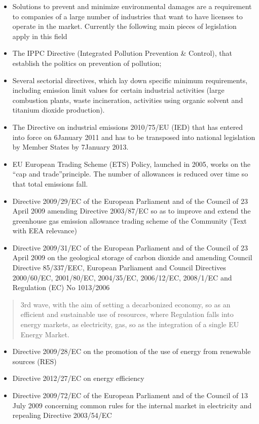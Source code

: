 \documentclass[]{book}
\theoremstyle{definition}
\theoremstyle{definition}
\theoremstyle{definition}
\theoremstyle{remark}
\begin{document}
\begin{itemize}
\item
  Solutions to prevent and minimize environmental damages are a
  requirement to companies of a large number of industries that want to
  have licenses to operate in the market. Currently the following main
  pieces of legislation apply in this field
\item
  The IPPC Directive (Integrated Pollution Prevention \& Control), that
  establish the politics on prevention of pollution;
\item
  Several sectorial directives, which lay down specific minimum
  requirements, including emission limit values for certain industrial
  activities (large combustion plants, waste incineration, activities
  using organic solvent and titanium dioxide production).
\item
  The Directive on industrial emissions 2010/75/EU (IED) that has
  entered into force on 6January 2011 and has to be transposed into
  national legislation by Member States by 7January 2013.
\item
  EU European Trading Scheme (ETS) Policy, launched in 2005, works on
  the ``cap and trade''principle. The number of allowances is reduced
  over time so that total emissions fall.
\item
  Directive 2009/29/EC of the European Parliament and of the Council of
  23 April 2009 amending Directive 2003/87/EC so as to improve and
  extend the greenhouse gas emission allowance trading scheme of the
  Community (Text with EEA relevance)
\item
  Directive 2009/31/EC of the European Parliament and of the Council of
  23 April 2009 on the geological storage of carbon dioxide and amending
  Council Directive 85/337/EEC, European Parliament and Council
  Directives 2000/60/EC, 2001/80/EC, 2004/35/EC, 2006/12/EC, 2008/1/EC
  and Regulation (EC) No 1013/2006
\end{itemize}

\begin{quote}
3rd wave, with the aim of setting a decarbonized economy, so as an
efficient and sustainable use of resources, where Regulation falls into
energy markets, as electricity, gas, so as the integration of a single
EU Energy Market.
\end{quote}

\begin{itemize}
\item
  Directive 2009/28/EC on the promotion of the use of energy from
  renewable sources (RES)
\item
  Directive 2012/27/EC on energy efficiency
\item
  Directive 2009/72/EC of the European Parliament and of the Council of
  13 July 2009 concerning common rules for the internal market in
  electricity and repealing Directive 2003/54/EC
\end{itemize}
\end{document}
